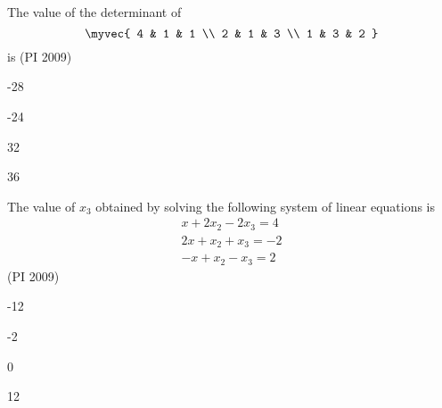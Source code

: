 \item The value of the determinant
	of
$$
\myvec{
4 & 1 & 1 \\
2 & 1 & 3 \\
1 & 3 & 2
}
$$
is
\hfill (PI 2009)
\begin{enumerate}
\begin{multicols}{4}
\item -28 
\item -24 
\item 32 
\item 36 
\end{multicols}
\end{enumerate}


\item The value of $x_3$ obtained by solving the following system of linear equations is
\begin{align*} 
x + 2x_2 - 2x_3 = 4 \\ 
2x + x_2 + x_3 = -2 \\
-x + x_2 - x_3 = 2
\end{align*}
\hfill (PI 2009)
\begin{enumerate}
\begin{multicols}{4}
\item -12 
\item -2 
\item 0 
\item 12 
\end{multicols} 
\end{enumerate}
